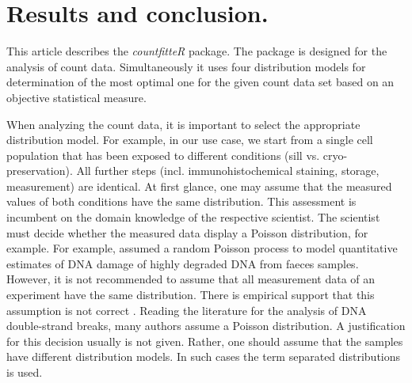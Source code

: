 % 
% 


\section{Results and conclusion.}

This article describes the \emph{countfitteR} package. The package is designed for the analysis of count data. Simultaneously it uses four distribution models for determination of the most optimal one for the given count data set based on an objective statistical measure.

When analyzing the count data, it is important to select the appropriate distribution model. For example, in our use case, we start from a single cell population that has been exposed to different conditions (sill vs. cryo-preservation). All further steps (incl. immunohistochemical staining, storage, measurement) are identical. At first glance, one may assume that the measured values of both conditions have the same distribution. This assessment is incumbent on the domain knowledge of the respective scientist. The scientist must decide whether the measured data display a Poisson distribution, for example. For example, \citet{deagle_quantification_2006} assumed a random Poisson process to model quantitative estimates of DNA damage of highly degraded DNA from faeces samples. However, it is not recommended to assume that all measurement data of an experiment have the same distribution. There is empirical support that this assumption is not correct \citep{myung_counting_2000}. Reading the literature for the analysis of DNA double-strand breaks, many authors assume a Poisson distribution. A justification for this decision usually is not given. Rather, one should assume that the samples have different distribution models. In such cases the term separated distributions is used. 

